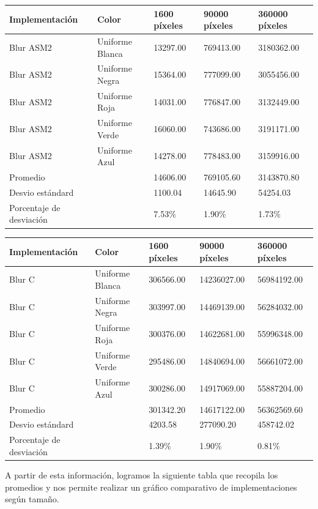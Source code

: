 \begin{tabular}{| l | l | l | l | l |}
\hline
Implementación & Color & 1600 píxeles & 90000 píxeles & 360000 píxeles\\
\hline
Blur ASM2 & Uniforme Blanca & 13297.00 & 769413.00 & 3180362.00\\ 
\hline
Blur ASM2 & Uniforme Negra & 15364.00 & 777099.00 & 3055456.00\\ 
\hline
Blur ASM2 & Uniforme Roja & 14031.00 & 776847.00 & 3132449.00\\ 
\hline
Blur ASM2 & Uniforme Verde & 16060.00 & 743686.00 & 3191171.00\\
\hline
Blur ASM2 & Uniforme Azul & 14278.00 & 778483.00 & 3159916.00\\
\hline
Promedio & &   14606.00 & 769105.60 & 3143870.80\\
\hline
Desvio estándard  &&  1100.04 & 14645.90 & 54254.03\\
\hline
Porcentaje de desviación  &&   7.53\% & 1.90\% & 1.73\%\\
\hline
\end{tabular}

\begin{tabular}{| l | l | l | l | l |}
\hline
Implementación & Color & 1600 píxeles & 90000 píxeles & 360000 píxeles\\
\hline
Blur C & Uniforme Blanca & 306566.00 & 14236027.00 & 56984192.00\\ 
\hline
Blur C & Uniforme Negra & 303997.00 & 14469139.00 & 56284032.00\\ 
\hline
Blur C & Uniforme Roja & 300376.00 & 14622681.00 & 55996348.00\\ 
\hline
Blur C & Uniforme Verde & 295486.00 & 14840694.00 & 56661072.00\\
\hline
Blur C & Uniforme Azul & 300286.00 & 14917069.00 & 55887204.00\\
\hline
Promedio & &   301342.20 & 14617122.00 & 56362569.60\\
\hline
Desvio estándard  &&  4203.58 & 277090.20 & 458742.02\\
\hline
Porcentaje de desviación  &&   1.39\% & 1.90\% & 0.81\%\\
\hline
\end{tabular}

A partir de esta información, logramos la siguiente tabla que recopila los promedios y nos permite realizar un gráfico comparativo de implementaciones según tamaño.\\



